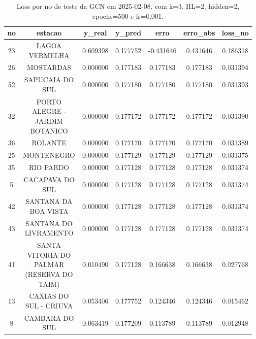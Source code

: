 \begin{table}[h]
\centering
\caption{Loss por no de teste da GCN em 2025-02-08, com k=3, HL=2, hidden=2, epochs=500 e lr=0.001.}
\label{tab:gcn_loss_k3_hl2_h2_e500_d20250208}
\begin{tabular}{ccccccc}
\toprule
no & estacao & y\_real & y\_pred & erro & erro\_abs & loss\_no \\
\midrule
23 & LAGOA VERMELHA & 0.609398 & 0.177752 & -0.431646 & 0.431646 & 0.186318 \\
26 & MOSTARDAS & 0.000000 & 0.177183 & 0.177183 & 0.177183 & 0.031394 \\
52 & SAPUCAIA DO SUL & 0.000000 & 0.177180 & 0.177180 & 0.177180 & 0.031393 \\
32 & PORTO ALEGRE - JARDIM BOTANICO & 0.000000 & 0.177172 & 0.177172 & 0.177172 & 0.031390 \\
36 & ROLANTE & 0.000000 & 0.177170 & 0.177170 & 0.177170 & 0.031389 \\
25 & MONTENEGRO & 0.000000 & 0.177129 & 0.177129 & 0.177129 & 0.031375 \\
35 & RIO PARDO & 0.000000 & 0.177128 & 0.177128 & 0.177128 & 0.031374 \\
5 & CACAPAVA DO SUL & 0.000000 & 0.177128 & 0.177128 & 0.177128 & 0.031374 \\
42 & SANTANA DA BOA VISTA & 0.000000 & 0.177128 & 0.177128 & 0.177128 & 0.031374 \\
43 & SANTANA DO LIVRAMENTO & 0.000000 & 0.177128 & 0.177128 & 0.177128 & 0.031374 \\
41 & SANTA VITORIA DO PALMAR (RESERVA DO TAIM) & 0.010490 & 0.177128 & 0.166638 & 0.166638 & 0.027768 \\
13 & CAXIAS DO SUL - CRIUVA & 0.053406 & 0.177752 & 0.124346 & 0.124346 & 0.015462 \\
8 & CAMBARA DO SUL & 0.063419 & 0.177209 & 0.113789 & 0.113789 & 0.012948 \\
\bottomrule
\end{tabular}
\end{table}
